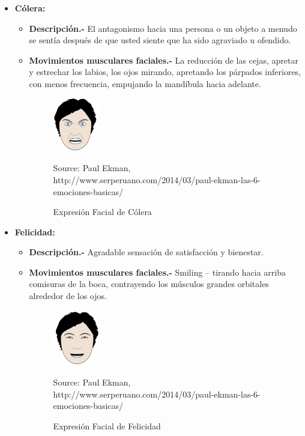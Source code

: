 \begin{itemize}
\item {\textbf{Cólera:} 
\begin{itemize}
\item \textbf{Descripción.-} El antagonismo hacia una persona o un objeto a menudo se sentía
después de que usted siente que ha sido agraviado u ofendido.
\item { \textbf{Movimientos musculares faciales.-} La reducción de las cejas, apretar y estrechar
los labios, los ojos mirando, apretando los párpados inferiores, con menos
frecuencia, empujando la mandíbula hacia adelante.

\begin{figure}[H]
		\centering
		\includegraphics[width=20mm]{./Imagenes/colera.png}
		\caption{Expresión Facial de Cólera}
		Source: Paul Ekman, http://www.serperuano.com/2014/03/paul-ekman-las-6-emociones-basicas/
		\label{fig:colera}
\end{figure}}
\end{itemize}}



\item {\textbf{Felicidad:} 
\begin{itemize}
\item \textbf{Descripción.-} Agradable sensación de satisfacción y bienestar.
\item { \textbf{Movimientos musculares faciales.-} Smiling – tirando hacia arriba comisuras de
la boca, contrayendo los músculos grandes orbitales alrededor de los ojos.

\begin{figure}[H]
		\centering
		\includegraphics[width=20mm]{./Imagenes/felicidad.png}
		\caption{Expresión Facial de Felicidad}
		Source: Paul Ekman, http://www.serperuano.com/2014/03/paul-ekman-las-6-emociones-basicas/
		\label{fig:felicidad}
\end{figure}}
\end{itemize}}




\end{itemize}
